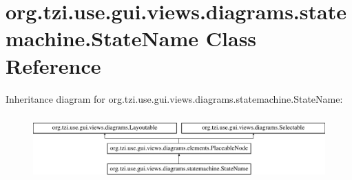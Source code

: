 \hypertarget{classorg_1_1tzi_1_1use_1_1gui_1_1views_1_1diagrams_1_1statemachine_1_1_state_name}{\section{org.\-tzi.\-use.\-gui.\-views.\-diagrams.\-statemachine.\-State\-Name Class Reference}
\label{classorg_1_1tzi_1_1use_1_1gui_1_1views_1_1diagrams_1_1statemachine_1_1_state_name}
}
Inheritance diagram for org.\-tzi.\-use.\-gui.\-views.\-diagrams.\-statemachine.\-State\-Name\-:\begin{figure}[H]
\begin{center}
\leavevmode
\includegraphics[height=2.514970cm]{classorg_1_1tzi_1_1use_1_1gui_1_1views_1_1diagrams_1_1statemachine_1_1_state_name}
\end{center}
\end{figure}
